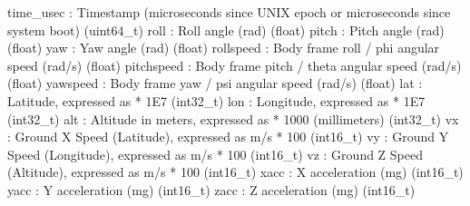 \begin{DoxyVerb}
\begin{DoxyVerb}
\begin{DoxyVerb}
\begin{DoxyVerb}
\begin{DoxyVerb}
time_usec                 : Timestamp (microseconds since UNIX epoch or microseconds since system boot) (uint64_t)
roll                      : Roll angle (rad) (float)
pitch                     : Pitch angle (rad) (float)
yaw                       : Yaw angle (rad) (float)
rollspeed                 : Body frame roll / phi angular speed (rad/s) (float)
pitchspeed                : Body frame pitch / theta angular speed (rad/s) (float)
yawspeed                  : Body frame yaw / psi angular speed (rad/s) (float)
lat                       : Latitude, expressed as * 1E7 (int32_t)
lon                       : Longitude, expressed as * 1E7 (int32_t)
alt                       : Altitude in meters, expressed as * 1000 (millimeters) (int32_t)
vx                        : Ground X Speed (Latitude), expressed as m/s * 100 (int16_t)
vy                        : Ground Y Speed (Longitude), expressed as m/s * 100 (int16_t)
vz                        : Ground Z Speed (Altitude), expressed as m/s * 100 (int16_t)
xacc                      : X acceleration (mg) (int16_t)
yacc                      : Y acceleration (mg) (int16_t)
zacc                      : Z acceleration (mg) (int16_t)\end{DoxyVerb}
 \mbox{\label{classpymavlink_1_1dialects_1_1v10_1_1MAVLink_a2e785283adb3de116ca65f95b6876eab}} 

\end{DoxyVerb}
\end{DoxyVerb}
\end{DoxyVerb}
\end{DoxyVerb}
